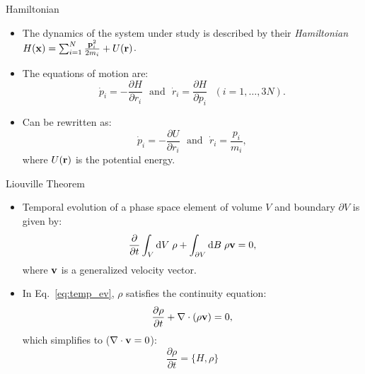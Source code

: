 \documentclass[10pt]{beamer}
\begin{document}
\begin{frame}{Hamiltonian}
\begin{itemize}
\setlength\itemsep{1em}
  \item The dynamics of the system under study is described by their \textit{Hamiltonian} $H({\bf x})=\sum_{i=1}^N \frac{{\bf p}_i^2}{2m_i} + U({\bf r})$.
  \item The equations of motion are:
  \begin{equation}
    \dot{p}_i = -\frac{\partial{H}}{\partial{r_i}}
    ~~~\mathrm{and}~~~
    \dot{r}_i = \frac{\partial{H}}{\partial{p_i}}~~~(i=1,\dots,3N).
  \end{equation}
  \item Can be rewritten as:
  \begin{equation}
    \dot{p}_i = -\frac{\partial{U}}{\partial{r_i}}
    ~~~\mathrm{and}~~~
    \dot{r}_i = \frac{p_i}{m_i},
  \end{equation}
  where $U({\bf r})$ is the potential energy.
\end{itemize}
\end{frame}

\begin{frame}{Liouville Theorem}
\begin{itemize}
\setlength\itemsep{1em}
  \item Temporal evolution of a phase space element of volume $V$ and boundary $\partial{V}$ is given by:
  \begin{equation}
  \label{eq:temp_ev}
    \frac{\partial}{\partial{t}} \int_V \mathrm{d} V\; \rho
      + \int_{\partial{V}}\mathrm{d} B\; \rho{\bf v} = 0,
  \end{equation}
  where ${\bf v}$ is a generalized velocity vector.

  \item In Eq.~\ref{eq:temp_ev}, $\rho$ satisfies the continuity equation:
  \begin{equation}
    \frac{\partial{\rho}}{\partial{t}} + \nabla\cdot(\rho{\bf v}) = 0,
  \end{equation}
  which simplifies to ($\nabla\cdot{\bf v} = 0$):
  \begin{equation}
    \frac{\partial{\rho}}{\partial{t}} = \{H, \rho\}
  \end{equation}
\end{itemize}
\end{frame}
\end{document}
